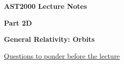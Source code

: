 



\vspace*{2cm}

{\centerline{\bf\huge AST2000 Lecture Notes}}

\vspace*{1cm}

\newcommand{\PartName}{2D}
\newcommand{\refproblem}[1]{\PartName.\ref{#1}}


{\centerline{\bf\LARGE Part \PartName}}\vspace*{0.25cm}
{\centerline{\bf\LARGE General Relativity: Orbits}}

\vspace*{1cm}

{\centerline{\underline{\LARGE Questions to ponder before the lecture}}}

\vspace*{1cm}

